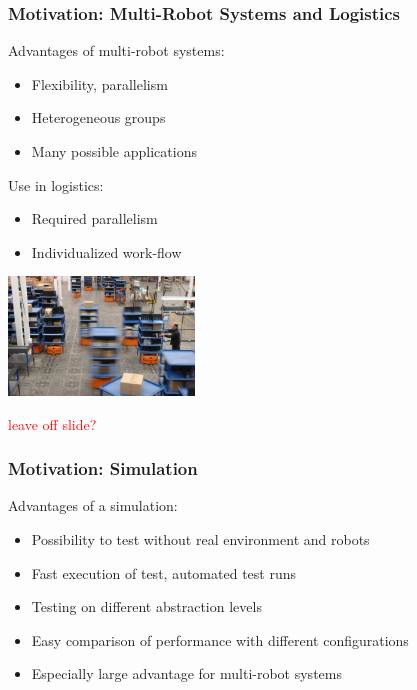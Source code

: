\documentclass[]{beamer}
\begin{document}
\begin{frame}
  \frametitle{Motivation: Multi-Robot Systems and Logistics}
  \begin{multicols}{2}
  Advantages of multi-robot systems:
  \begin{itemize}
  \item Flexibility, parallelism
  \item Heterogeneous groups %
  \item Many possible applications %
  \end{itemize}
  Use in logistics:
  \begin{itemize}
  \item Required parallelism
  \item Individualized work-flow
  \end{itemize}
  \includegraphics[width=140pt]{../pics/kiva.jpg}
  \end{multicols}
  \textcolor{red}{leave off slide?}
\end{frame}

\begin{frame}
  \frametitle{Motivation: Simulation}
  Advantages of a simulation:
  \begin{itemize}
  \item Possibility to test without real environment and robots
  \item Fast execution of test, automated test runs
  \item Testing on different abstraction levels
  \item Easy comparison of performance with different configurations 
  \item Especially large advantage for multi-robot systems
  \end{itemize}
\end{frame}
\end{document}
